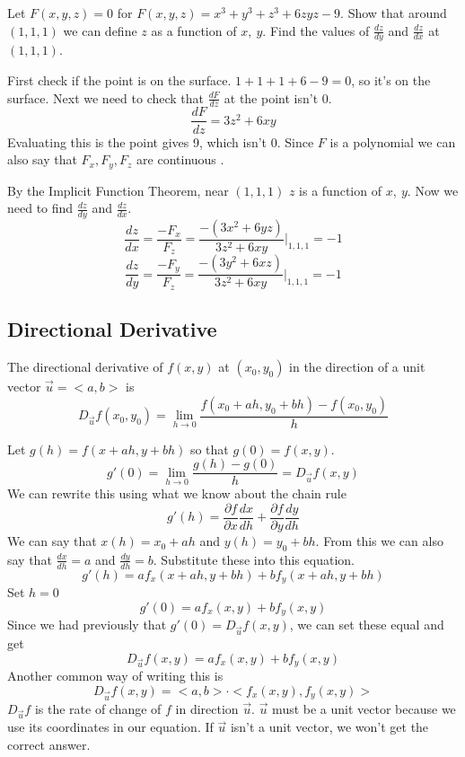 \documentclass[12 pt]{article}
\begin{document}
        \begin{exmp*}
            Let $F(x,y,z)=0$ for $F(x,y,z)=x^3+y^3+z^3+6zyz-9$. Show that around $(1,1,1)$ we can define $z$ as a function of $x,\ y$. Find the values of $\frac{dz}{dy}$ and $\frac{dz}{dx}$ at $(1,1,1)$.

            First check if the point is on the surface. $1+1+1+6-9=0$, so it's on the surface. Next we need to check that $\frac{dF}{dz}$ at the point isn't 0.
            $$\frac{dF}{dz}=3z^2+6xy$$
            Evaluating this is the point gives 9, which isn't 0. Since $F$ is a polynomial we can also say that $F_x,F_y,F_z$ are continuous .

            By the Implicit Function Theorem, near $(1,1,1)$ $z$ is a function of $x,\ y$. Now we need to find $\frac{dz}{dy}$ and $\frac{dz}{dx}$.
            $$\frac{dz}{dx}=\frac{-F_x}{F_z}=\frac{-(3x^2+6yz)}{3z^2+6xy}\Big|_{1,1,1}=-1$$
            $$\frac{dz}{dy}=\frac{-F_y}{F_z}=\frac{-(3y^2+6xz)}{3z^2+6xy}\Big|_{1,1,1}=-1$$
        \end{exmp*}

        \subsection{Directional Derivative}

        \begin{def*}
            The directional derivative of $f(x,y)$ at $(x_0,y_0)$ in the direction of a unit vector $\vec{u}=<a,b>$ is
            $$D_{\vec{u}}f(x_0,y_0)=\lim_{h\rightarrow 0}\frac{f(x_0+ah,y_0+bh)-f(x_0,y_0)}{h}$$
        \end{def*}
        Let $g(h)=f(x+ah, y+bh)$ so that $g(0)=f(x,y)$.
        $$g'(0)=\lim_{h\rightarrow 0}\frac{g(h)-g(0)}{h}=D_{\vec{u}}f(x,y)$$
        We can rewrite this using what we know about the chain rule
        $$g'(h)=\frac{\partial f}{\partial x}\frac{dx}{dh}+\frac{\partial f}{\partial y}\frac{dy}{dh}$$
        We can say that $x(h)=x_0+ah$ and $y(h)=y_0+bh$. From this we can also say that $\frac{dx}{dh}=a$ and $\frac{dy}{dh}=b$. Substitute these into this equation.
        $$g'(h)=af_x(x+ah,y+bh)+bf_y(x+ah,y+bh)$$
        Set $h=0$
        $$g'(0)=af_x(x,y)+bf_y(x,y)$$
        Since we had previously that $g'(0)=D_{\vec{u}}f(x,y)$, we can set these equal and get
        $$D_{\vec{u}}f(x,y)=af_x(x,y)+bf_y(x,y)$$
        Another common way of writing this is
        $$D_{\vec{u}}f(x,y)=<a,b>\cdot<f_x(x,y),f_y(x,y)>$$
        $D_{\vec{u}}f$ is the rate of change of $f$ in direction $\vec{u}$. $\vec{u}$ must be a unit vector because we use its coordinates in our equation. If $\vec{u}$ isn't a unit vector, we won't get the correct answer.
\end{document}
